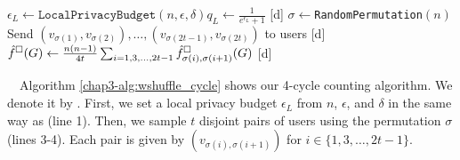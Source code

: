 \setlength{\algomargin}{5mm}
\begin{algorithm}[t]
  \SetAlgoLined
  $\epsilon_L \leftarrow \texttt{LocalPrivacyBudget}(n,\epsilon,\delta)$\;
  [d] $q_L \leftarrow \frac{1}{e^{\epsilon_L}+1}$\;
  [d] $\sigma \leftarrow$\texttt{RandomPermutation}$(n)$\;
  [d] Send $(v_{\sigma(1)}, v_{\sigma(2)}), \ldots, (v_{\sigma(2t-1)}, v_{\sigma(2t)})$ to users\;
  [d] $\hat{f}^\square(G) \leftarrow \frac{n(n-1)}{4t}\sum_{i=1,3,\ldots,2t-1} \hat{f}_{\sigma(i),\sigma(i+1)}^\square(G)$\;
  [d] 
  \caption[Our 4-cycle counting algorithm \AlgWSCyc{}.]{Our 4-cycle counting algorithm \AlgWSCyc{}.
  \AlgWS{} is shown in Algorithm~\ref{chap3-alg:WShuffle}.
  }\label{chap3-alg:wshuffle_cycle}
\end{algorithm}

~~Algorithm \ref{chap3-alg:wshuffle_cycle} shows our 4-cycle counting algorithm. 
We denote it by \AlgWSCyc{}. 
First, we set a local privacy budget $\epsilon_L$ from $n$, $\epsilon$, and $\delta$ in the same way as \AlgWSLE{} (line 1). 
Then, we sample $t$ disjoint pairs of users using the permutation $\sigma$ (lines 3-4). 
Each pair is given by $(v_{\sigma(i), \sigma(i+1)})$ for $i \in \{1, 3, \ldots, 2t-1\}$.


